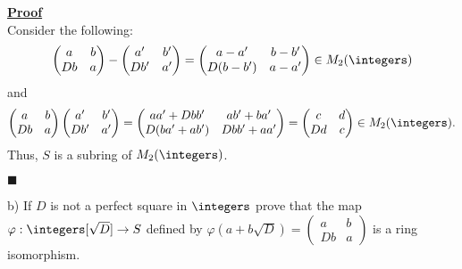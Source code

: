 \documentclass[12pt,a4paper]{article}
\newenvironment{proof}
{
\textbf{\underline{Proof}} \\
}
{
\begin{flushright}
$\blacksquare$
\end{flushright}}
\begin{document}
\begin{proof}
Consider the following:
\begin{align*}
	\begin{pmatrix}
		a & b \\
		Db & a
	\end{pmatrix}
	-
	\begin{pmatrix}
		a' & b' \\
		Db' & a'
	\end{pmatrix}
	=
	\begin{pmatrix}
		a  - a' & b - b' \\
		D(b - b') & a - a'
	\end{pmatrix}
	\in M_2(\integers)
\end{align*}
and
\begin{align*}
\begin{pmatrix}
		a & b \\
		Db & a
	\end{pmatrix}
	\begin{pmatrix}
		a' & b' \\
		Db' & a'
	\end{pmatrix}
	=
	\begin{pmatrix}
		aa' + Dbb' & ab' + ba' \\
		D(ba' + ab') & Dbb' + aa'
	\end{pmatrix}
	=
	\begin{pmatrix}
		c & d \\
		Dd & c
	\end{pmatrix}
	\in M_2(\integers)
.\end{align*}
Thus, $S$ is a subring of $M_2(\integers)$.
\end{proof}

b) If $D$ is not a perfect square in $\integers$ prove that the map $\varphi: \integers[\sqrt{D}] \to S$ defined by $\varphi\left( a + b\sqrt{D} \right) = \begin{pmatrix}
    a & b \\
    Db & a
\end{pmatrix}$ is a ring isomorphism.
\end{document}
